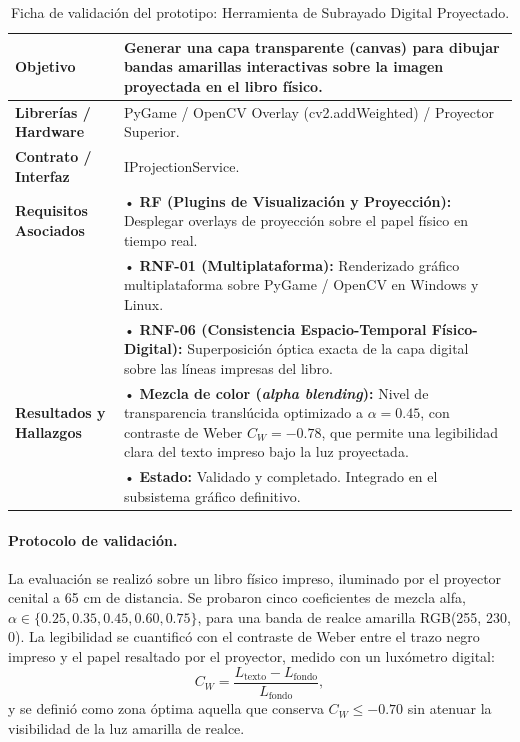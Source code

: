 \begin{table}[H]
    \centering
    \caption{Ficha de validación del prototipo: Herramienta de Subrayado Digital Proyectado.}
    \label{tab:ficha_f27}
    \begin{tabular}{|L{3.2cm}|L{11.0cm}|}
        \hline
        \textbf{Objetivo} & Generar una capa transparente (canvas) para dibujar bandas amarillas interactivas sobre la imagen proyectada en el libro físico. \\ \hline
        \textbf{Librerías / Hardware} & PyGame / OpenCV Overlay (cv2.addWeighted) / Proyector Superior. \\ \hline
        \textbf{Contrato / Interfaz} & IProjectionService. \\ \hline
        \textbf{Requisitos Asociados} &
        • \textbf{RF (Plugins de Visualización y Proyección):} Desplegar overlays de proyección sobre el papel físico en tiempo real. \vspace{0.1cm} \\
        & • \textbf{RNF-01 (Multiplataforma):} Renderizado gráfico multiplataforma sobre PyGame / OpenCV en Windows y Linux. \vspace{0.1cm} \\
        & • \textbf{RNF-06 (Consistencia Espacio-Temporal Físico-Digital):} Superposición óptica exacta de la capa digital sobre las líneas impresas del libro. \\ \hline
        \textbf{Resultados y Hallazgos} &
        • \textbf{Mezcla de color (\textit{alpha blending}):} Nivel de transparencia translúcida optimizado a $\alpha=0.45$, con contraste de Weber $C_W=-0.78$, que permite una legibilidad clara del texto impreso bajo la luz proyectada. \vspace{0.1cm} \\
        & • \textbf{Estado:} Validado y completado. Integrado en el subsistema gráfico definitivo. \\ \hline
    \end{tabular}
\end{table}
 
\paragraph{Protocolo de validación.} La evaluación se realizó sobre un libro físico impreso, iluminado por el proyector cenital a 65 cm de distancia. Se probaron cinco coeficientes de mezcla alfa, $\alpha \in \{0.25, 0.35, 0.45, 0.60, 0.75\}$, para una banda de realce amarilla RGB(255, 230, 0). La legibilidad se cuantificó con el contraste de Weber entre el trazo negro impreso y el papel resaltado por el proyector, medido con un luxómetro digital:
\[ C_W = \frac{L_{\mathrm{texto}} - L_{\mathrm{fondo}}}{L_{\mathrm{fondo}}}, \]
y se definió como zona óptima aquella que conserva $C_W \le -0.70$ sin atenuar la visibilidad de la luz amarilla de realce.
 
